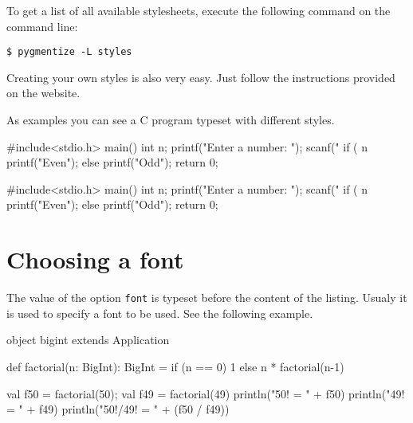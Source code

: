 \documentclass[10pt,a4paper]{article}
\begin{document}
To get a list of all available stylesheets, execute the following
command on the command line:
\begin{verbatim}
$ pygmentize -L styles
\end{verbatim}

Creating your own styles is also very easy. Just follow the instructions
provided on the website.

As examples you can see a C program typeset with different styles.

\begin{Example}
\noindent
\begin{minipage}[t]{0.49\linewidth}
  \begin{pygmented}[lang=c,gobble=4,sty=murphy]
    #include<stdio.h> 
    main()
    { int n;
      printf("Enter a number: ");
      scanf("%
      if ( n%
         printf("Even\n");
      else
         printf("Odd\n");
      return 0;
    }
  \end{pygmented}
\end{minipage}
\hfil
\begin{minipage}[t]{0.49\linewidth}
  \begin{pygmented}[lang=c,gobble=4,sty=trac]
    #include<stdio.h> 
    main()
    { int n;
      printf("Enter a number: ");
      scanf("%
      if ( n%
         printf("Even\n");
      else
         printf("Odd\n");
      return 0;
    }
  \end{pygmented}
\end{minipage}
\end{Example}

\section{Choosing a font}

The value of the option \verb|font| is typeset before the content of the
listing. Usualy it is used to specify a font to be used. See the
following example.

\begin{Example}
\begin{pygmented}[lang=scala,font=\rmfamily\scshape\large]
object bigint extends Application {
  def factorial(n: BigInt): BigInt =
    if (n == 0) 1 else n * factorial(n-1)

  val f50 = factorial(50); val f49 = factorial(49)
  println("50! = " + f50)
  println("49! = " + f49)
  println("50!/49! = " + (f50 / f49))
}
\end{pygmented}
\end{Example}
\end{document}
